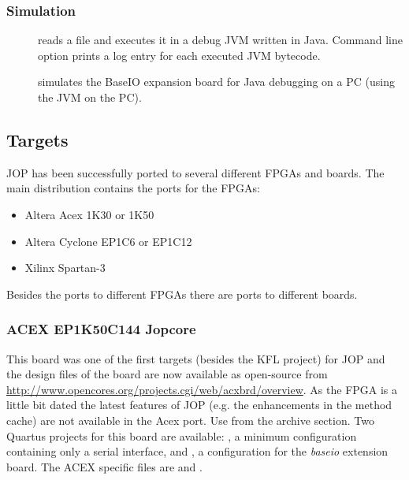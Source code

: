 \subsubsection{Simulation}


\begin{description}
    \item[] reads a  file and executes it in
    a debug JVM written in Java. Command line option
     prints a log entry for each executed JVM
    bytecode.
    \item[] simulates the BaseIO expansion board for Java
    debugging on a PC (using the JVM on the PC).
\end{description}

\subsection{Targets}

JOP has been successfully ported to several different FPGAs and
boards. The main distribution contains the ports for the FPGAs:

\begin{itemize}
    \item Altera Acex 1K30 or 1K50
    \item Altera Cyclone EP1C6 or EP1C12
    \item Xilinx Spartan-3
\end{itemize}

Besides the ports to different FPGAs there are ports to different
boards.

\subsubsection{ACEX EP1K50C144 Jopcore}

This board was one of the first targets (besides the KFL project)
for JOP and the design files of the board are now available as
open-source from
\url{http://www.opencores.org/projects.cgi/web/acxbrd/overview}. As
the FPGA is a little bit dated the latest features of JOP (e.g. the
enhancements in the method cache) are not available in the Acex
port. Use  from the archive
section. Two Quartus projects for this board are available:
, a minimum configuration containing only a serial
interface, and , a configuration for the \emph{baseio}
extension board. The ACEX specific files are  and
.

